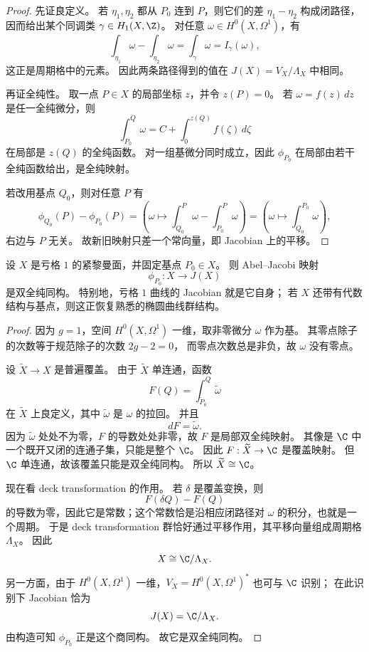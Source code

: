 \begin{proof}
先证良定义。
若 $\eta_1,\eta_2$ 都从 $P_0$ 连到 $P$，则它们的差 $\eta_1-\eta_2$ 构成闭路径，因而给出某个同调类 $\gamma\in H_1(X,\Z)$。
对任意 $\omega\in H^0(X,\Omega^1)$，有
\[
  \int_{\eta_1}\omega-\int_{\eta_2}\omega
  =\int_{\gamma}\omega=I_\gamma(\omega),
\]
这正是周期格中的元素。
因此两条路径得到的值在 $J(X)=V_X/\Lambda_X$ 中相同。

再证全纯性。
取一点 $P\in X$ 的局部坐标 $z$，并令 $z(P)=0$。
若 $\omega=f(z)\,dz$ 是任一全纯微分，则
\[
  \int_{P_0}^{Q}\omega
  =C+\int_0^{z(Q)} f(\zeta)\,d\zeta
\]
在局部是 $z(Q)$ 的全纯函数。
对一组基微分同时成立，因此 $\phi_{P_0}$ 在局部由若干全纯函数给出，是全纯映射。

若改用基点 $Q_0$，则对任意 $P$ 有
\[
  \phi_{Q_0}(P)-\phi_{P_0}(P)
  =\left(\omega\mapsto \int_{Q_0}^{P}\omega-\int_{P_0}^{P}\omega\right)
  =\left(\omega\mapsto \int_{Q_0}^{P_0}\omega\right),
\]
右边与 $P$ 无关。
故新旧映射只差一个常向量，即 Jacobian 上的平移。
\end{proof}

\begin{theorem}
\label{thm:genus1-jacobian}
设 $X$ 是亏格 $1$ 的紧黎曼面，并固定基点 $P_0\in X$。
则 Abel--Jacobi 映射
\[
  \phi_{P_0}:X\longrightarrow J(X)
\]
是双全纯同构。
特别地，亏格 $1$ 曲线的 Jacobian 就是它自身；
若 $X$ 还带有代数结构与基点，则这正恢复熟悉的椭圆曲线群结构。
\end{theorem}

\begin{proof}
因为 $g=1$，空间 $H^0(X,\Omega^1)$ 一维，取非零微分 $\omega$ 作为基。
其零点除子的次数等于规范除子的次数 $2g-2=0$，
而零点次数总是非负，故 $\omega$ 没有零点。

设 $\widetilde{X}\to X$ 是普遍覆盖。
由于 $\widetilde{X}$ 单连通，函数
\[
  F(Q)=\int_{\widetilde{P}_0}^{Q} \widetilde{\omega}
\]
在 $\widetilde{X}$ 上良定义，其中 $\widetilde{\omega}$ 是 $\omega$ 的拉回。
并且
\[
  dF=\widetilde{\omega}.
\]
因为 $\widetilde{\omega}$ 处处不为零，$F$ 的导数处处非零，故 $F$ 是局部双全纯映射。
其像是 $\C$ 中一个既开又闭的连通子集，只能是整个 $\C$。
因此 $F:\widetilde{X}\to\C$ 是覆盖映射。
但 $\C$ 单连通，故该覆盖只能是双全纯同构。
所以 $\widetilde{X}\cong\C$。

现在看 deck transformation 的作用。
若 $\delta$ 是覆盖变换，则
\[
  F(\delta Q)-F(Q)
\]
的导数为零，因此它是常数；这个常数恰是沿相应闭路径对 $\omega$ 的积分，也就是一个周期。
于是 deck transformation 群恰好通过平移作用，其平移向量组成周期格 $\Lambda_X$。
因此
\[
  X\cong \C/\Lambda_X.
\]
另一方面，由于 $H^0(X,\Omega^1)$ 一维，$V_X=H^0(X,\Omega^1)^*$ 也可与 $\C$ 识别；
在此识别下 Jacobian 恰为
\[
  J(X)=\C/\Lambda_X.
\]
由构造可知 $\phi_{P_0}$ 正是这个商同构。
故它是双全纯同构。
\end{proof}

